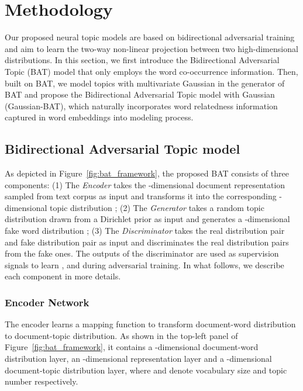 \documentclass[11pt,a4paper]{article}
\begin{document}
\section{Methodology}

Our proposed neural topic models are based on bidirectional adversarial training~\cite{donahue2016adversarial} and aim to learn the two-way non-linear projection between two high-dimensional distributions. In this section, we first introduce the Bidirectional Adversarial Topic (BAT) model
that only employs the word co-occurrence information. Then, built on BAT, we model topics with multivariate Gaussian in the generator of BAT and propose the Bidirectional Adversarial Topic model with Gaussian (Gaussian-BAT), which naturally incorporates word relatedness information captured in word embeddings into modeling process. 

\subsection{Bidirectional Adversarial Topic model}

As depicted in Figure~\ref{fig:bat_framework},  the proposed BAT consists of three components: (1) The \emph{Encoder}  takes the -dimensional document representation  sampled from text corpus  as input and transforms it into the corresponding -dimensional topic distribution ; (2) The \emph{Generator}  takes a random topic distribution  drawn from a Dirichlet prior as input and generates a -dimensional fake word distribution ; (3) The \emph{Discriminator}  takes the real distribution pair  and fake distribution pair  as input and discriminates the real distribution pairs from the fake ones. The outputs of the discriminator are used as supervision signals to learn ,  and  during adversarial training.  In what follows, we describe each component in more details.




\subsubsection{Encoder Network}
The encoder learns a mapping function to transform document-word distribution to document-topic distribution. As shown in the top-left panel of Figure~\ref{fig:bat_framework}, it contains a -dimensional document-word distribution layer, an -dimensional representation layer and a -dimensional document-topic distribution layer, where  and  denote vocabulary size and topic number respectively. 
\end{document}
